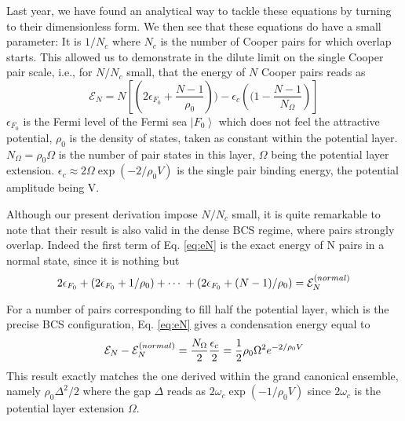 \documentclass[aps,prb,amsmath,amssymb,superscriptaddress,twocolumn]{revtex4-1}
\newcommand{\nth}[1]{\ensuremath{\frac{1}{#1}}}
\newcommand{\br}[1]{\ensuremath{\left(#1\right)}}
\newcommand{\mbr}[1]{\ensuremath{\left[#1\right]}}
\newcommand{\efo}{\epsilon_{F_0}}
\begin{document}
Last year, we have found an analytical way to tackle these equations by turning to their dimensionless form.  We then see that these equations do have a small parameter: It is  $1/{N_c}$ where $N_c$ is the number of Cooper pairs for which overlap starts.  This allowed us to demonstrate in the dilute limit on the single Cooper pair scale, i.e., for $N/N_c$ small, that the energy of $N$ Cooper pairs reads as 
\begin{equation}\label{eq:eN}
\mathcal{E}_{N}=N\mbr{\br{2\epsilon_{F_0}+\frac{N-1}{\rho_0}})-\epsilon_c\br{(1-\frac{N-1}{N_\Omega}}}
\end{equation}
$\epsilon_{F_0}$ is the Fermi level of the Fermi sea $\left\vert F_{0}\right\rangle$ which does not feel the attractive potential, $\rho_0$ is the density of states, taken as constant within the potential layer.  $N_\Omega=\rho_0\Omega$ is the number of pair states in this layer, $\Omega$ being the potential layer extension.  $\epsilon_c\approx2\Omega\exp\br{-2/\rho_0V}$ is the single pair binding energy, the potential amplitude being V. 

Although our present derivation impose $N/N_c$ small, it is quite remarkable to note that their result is also valid in the dense BCS regime, where pairs strongly overlap. Indeed the first term of Eq. \eqref{eq:eN} is the exact energy of N pairs in a normal state, since it is nothing but 
\begin{equation}
2\efo+\br{2\efo+1/\rho_0}+\cdots\;+\br{2\efo+(N-1)/\rho_0}=\mathcal{E}_{N}^{\text(normal)}
\end{equation} 

For a number of pairs corresponding to fill  half the potential layer, which is the precise BCS configuration, Eq. \eqref{eq:eN} gives a condensation energy equal to 
\begin{equation}
\mathcal{E}_{N}-\mathcal{E}_{N}^{\text(normal)}=\frac{N_\Omega}{2}\frac{\epsilon_c}{2}=\nth{2}\rho_0\Omega^2e^{-2/\rho_0V}
\end{equation}
This result exactly matches the one derived within the grand canonical ensemble, namely $\rho_0\Delta^2/2$ where the gap $\Delta$ reads as $2\omega_c\exp\br{-1/\rho_0V}$ since $2\omega_c$ is the potential layer extension $\Omega$.
\end{document}
